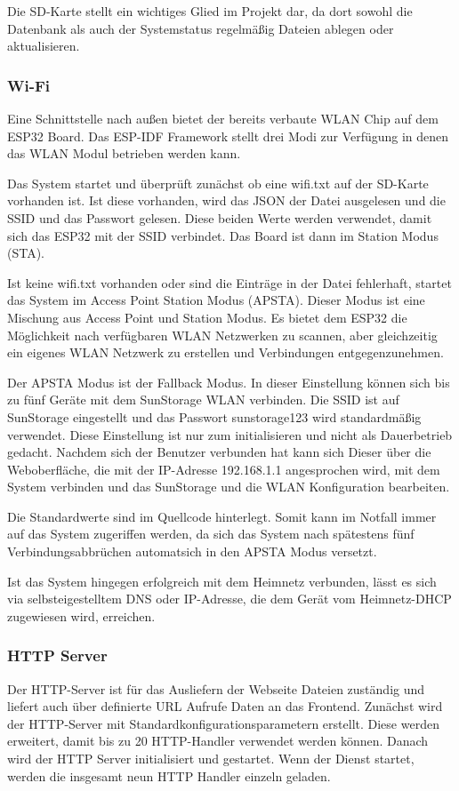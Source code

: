 Die SD-Karte stellt ein wichtiges Glied im Projekt dar, da dort sowohl die Datenbank als auch der Systemstatus regelmäßig Dateien ablegen oder aktualisieren.


\subsubsection{Wi-Fi}
Eine Schnittstelle nach außen bietet der bereits verbaute WLAN Chip auf dem ESP32 Board. Das ESP-IDF Framework stellt drei Modi zur Verfügung in denen das WLAN Modul betrieben werden kann.

Das System startet und überprüft zunächst ob eine \glqq wifi.txt\grqq{} auf der SD-Karte vorhanden ist. Ist diese vorhanden, wird das JSON der Datei ausgelesen und die SSID und das Passwort gelesen.
Diese beiden Werte werden verwendet, damit sich das ESP32 mit der SSID verbindet. Das Board ist dann im Station Modus (STA).

Ist keine \glqq wifi.txt\grqq{} vorhanden oder sind die Einträge in der Datei fehlerhaft, startet das System im Access Point Station Modus (APSTA). Dieser Modus ist eine Mischung aus Access Point und Station Modus.
Es bietet dem ESP32 die Möglichkeit nach verfügbaren WLAN Netzwerken zu scannen, aber gleichzeitig ein eigenes WLAN Netzwerk zu erstellen und Verbindungen entgegenzunehmen.

Der APSTA Modus ist der Fallback Modus. In dieser Einstellung können sich bis zu fünf Geräte mit dem SunStorage WLAN verbinden. Die SSID ist auf \glqq SunStorage\grqq{} eingestellt und das Passwort \glqq sunstorage123\grqq{} wird standardmäßig verwendet.
Diese Einstellung ist nur zum initialisieren und nicht als Dauerbetrieb gedacht. Nachdem sich der Benutzer verbunden hat kann sich Dieser über die Weboberfläche, die mit der IP-Adresse 192.168.1.1 angesprochen wird, mit dem System verbinden und das SunStorage und die WLAN Konfiguration bearbeiten.

Die Standardwerte sind im Quellcode hinterlegt. Somit kann im Notfall immer auf das System zugeriffen werden, da sich das System nach spätestens fünf Verbindungsabbrüchen automatsich in den APSTA Modus versetzt.

Ist das System hingegen erfolgreich mit dem Heimnetz verbunden, lässt es sich via selbsteigestelltem DNS oder IP-Adresse, die dem Gerät vom Heimnetz-DHCP zugewiesen wird, erreichen.

\subsubsection{HTTP Server}
Der HTTP-Server ist für das Ausliefern der Webseite Dateien zuständig und liefert auch über definierte URL Aufrufe Daten an das Frontend. Zunächst wird der HTTP-Server mit Standardkonfigurationsparametern erstellt.
Diese werden erweitert, damit bis zu 20 HTTP-Handler verwendet werden können. Danach wird der HTTP Server initialisiert und gestartet. Wenn der Dienst startet, werden die insgesamt neun HTTP Handler einzeln geladen.

